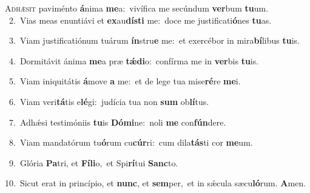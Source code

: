 \lettrine{\initial\textcolor{\initialcolor}{A}}{dhǽsit} paviménto \textbf{á}\-nima \textbf{me}\-a:~\star vivífica me secúndum \textbf{ver}\-bum \textbf{tu}\-um.\\
{\numbfont\textcolor{\numbcolor}{~2.}}~Vias meas enuntiávi et \textbf{ex}\-au\-\textbf{dís}\-\textbf{ti} me:~\star doce me justificati\-\textbf{ó}\-nes \textbf{tu}\-as.\par
{\numbfont\textcolor{\numbcolor}{~3.}}~Viam justificatiónum tuárum \textbf{ín}\-stru\textbf{e} me:~\star et exercébor in mira\-\textbf{bí}\-libus \textbf{tu}\-is.\par
{\numbfont\textcolor{\numbcolor}{~4.}}~Dormitávit ánima \textbf{me}\-a præ \textbf{tǽ}\-\textbf{di}o:~\star confírma me in \textbf{ver}\-bis \textbf{tu}\-is.\par
{\numbfont\textcolor{\numbcolor}{~5.}}~Viam iniquitátis \textbf{á}\-move \textbf{a} me:~\star et de lege tua mise\-\textbf{ré}\-re \textbf{me}\-i.\par
{\numbfont\textcolor{\numbcolor}{~6.}}~Viam veri\-\textbf{tá}\-tis e\-\textbf{lé}\-gi:~\star judícia tua non \textbf{sum} ob\-\textbf{lí}\-tus.\par
{\numbfont\textcolor{\numbcolor}{~7.}}~Adhǽsi testimóniis \textbf{tu}\-is \textbf{Dó}\-\textbf{mi}ne:~\star noli \textbf{me} con\-\textbf{fún}\-dere.\par
{\numbfont\textcolor{\numbcolor}{~8.}}~Viam mandatórum tu\-\textbf{ó}\-rum cu\-\textbf{cúr}\-ri:~\star cum dila\-\textbf{tás}\-ti cor \textbf{me}\-um.\par
{\numbfont\textcolor{\numbcolor}{~9.}}~Glória \textbf{Pa}\-tri, et \textbf{Fí}\-\textbf{li}o,~\star et Spi\-\textbf{rí}\-tui \textbf{Sanc}\-to.\par
{\numbfont\textcolor{\numbcolor}{10.}}~Sicut erat in princípio, et \textbf{nunc}\-, et \textbf{sem}\-per,~\star et in sǽcula sæcu\-\textbf{ló}\-rum. \textbf{A}\-men.\par
